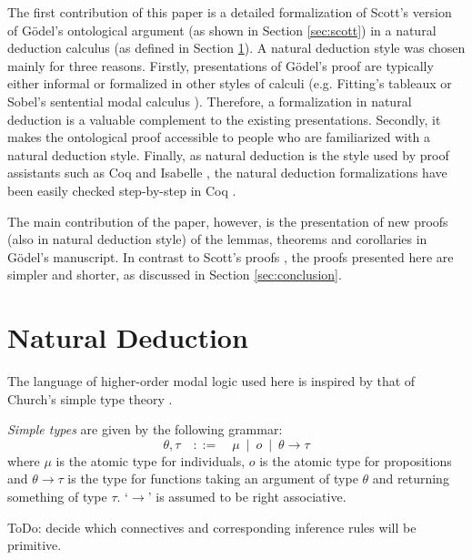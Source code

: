 \documentclass{llncs}
\newcommand{\imp}{\rightarrow}
\begin{document}
The first contribution of this paper is a detailed formalization of Scott's version \cite{Scott} of G\"odel's ontological argument \cite{Goedel} (as shown in Section \ref{sec:scott}) in a natural deduction calculus (as defined in Section \ref{sec:calculus}). A natural deduction style \citep{gentzen,prawitz} was chosen mainly for three reasons. Firstly, presentations of G\"odel's proof are typically either informal or formalized in other styles of calculi (e.g. Fitting's tableaux \cite{fitting} or Sobel's sentential modal calculus \cite{sobel2}). Therefore, a formalization in natural deduction is a valuable complement to the existing presentations. Secondly, it makes the ontological proof accessible to people who are familiarized with a natural deduction style. Finally, as natural deduction is the style used by proof assistants such as Coq \cite{coq} and Isabelle \cite{isabelle}, the natural deduction formalizations have been easily checked step-by-step in Coq \cite{coqformalizations}.

The main contribution of the paper, however, is the presentation of new proofs (also in natural deduction style) of the lemmas, theorems and corollaries in G\"odel's manuscript. In contrast to Scott's proofs \cite{Scott}, the proofs presented here are simpler and shorter, as discussed in Section \ref{sec:conclusion}.



\section{Natural Deduction}
\label{sec:calculus}

The language of higher-order modal logic used here is inspired by that of Church's simple type theory \citep{church}.

\begin{definition} \emph{Simple types} are given by the following grammar:
$$
  \theta,\tau \quad ::= \quad \mu \ \mid \ o \ \mid \ \theta \imp \tau
$$
where $\mu$ is the atomic type for individuals, $o$ is the atomic type for propositions and $\theta \imp \tau$ is the type for functions taking an argument of type $\theta$ and returning something of type $\tau$. `$\imp$' is assumed to be right associative.
\end{definition}

ToDo: decide which connectives and corresponding inference rules will be primitive.
\end{document}
